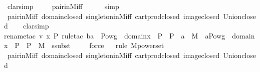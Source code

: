 \begin{isabellebody}
\ clarsimp\ \isanewline
\ \ \isamarkupfalse%
\ pair{\isacharunderscore}{\kern0pt}in{\isacharunderscore}{\kern0pt}M{\isacharunderscore}{\kern0pt}iff\ \isanewline
\ \ \ \isamarkupfalse%
\ simp\isanewline
\ \ \isamarkupfalse%
\ pair{\isacharunderscore}{\kern0pt}in{\isacharunderscore}{\kern0pt}M{\isacharunderscore}{\kern0pt}iff\ domain{\isacharunderscore}{\kern0pt}closed\ singleton{\isacharunderscore}{\kern0pt}in{\isacharunderscore}{\kern0pt}M{\isacharunderscore}{\kern0pt}iff\ cartprod{\isacharunderscore}{\kern0pt}closed\ image{\isacharunderscore}{\kern0pt}closed\ Union{\isacharunderscore}{\kern0pt}closed\isanewline
\ \ \isamarkupfalse%
\ clarsimp\ \isanewline
\ \ \isamarkupfalse%
{\isacharparenleft}{\kern0pt}rename{\isacharunderscore}{\kern0pt}tac\ v\ x\ P{\isacharcomma}{\kern0pt}\ rule{\isacharunderscore}{\kern0pt}tac\ b{\isacharequal}{\kern0pt}{\isachardoublequoteopen}{\isacharbraceleft}{\kern0pt}a\ {\isasymin}\ Pow{\isacharparenleft}{\kern0pt}{\isacharparenleft}{\kern0pt}{\isasymUnion}{\isacharparenleft}{\kern0pt}g\ {\isacharbackquote}{\kern0pt}{\isacharbackquote}{\kern0pt}\ {\isacharparenleft}{\kern0pt}domain{\isacharparenleft}{\kern0pt}x{\isacharparenright}{\kern0pt}\ {\isasymtimes}\ {\isacharbraceleft}{\kern0pt}P{\isacharbraceright}{\kern0pt}{\isacharparenright}{\kern0pt}{\isacharparenright}{\kern0pt}{\isacharparenright}{\kern0pt}\ {\isasymtimes}\ P{\isacharparenright}{\kern0pt}\ {\isachardot}{\kern0pt}\ a\ {\isasymin}\ M{\isacharbraceright}{\kern0pt}{\isachardoublequoteclose}\ \ a{\isacharequal}{\kern0pt}{\isachardoublequoteopen}Pow{\isacharparenleft}{\kern0pt}{\isacharparenleft}{\kern0pt}{\isasymUnion}{\isacharparenleft}{\kern0pt}g\ {\isacharbackquote}{\kern0pt}{\isacharbackquote}{\kern0pt}\ {\isacharparenleft}{\kern0pt}domain{\isacharparenleft}{\kern0pt}x{\isacharparenright}{\kern0pt}\ {\isasymtimes}\ {\isacharbraceleft}{\kern0pt}P{\isacharbraceright}{\kern0pt}{\isacharparenright}{\kern0pt}{\isacharparenright}{\kern0pt}{\isacharparenright}{\kern0pt}\ {\isasymtimes}\ P{\isacharparenright}{\kern0pt}\ {\isasyminter}\ M{\isachardoublequoteclose}\ \ ssubst{\isacharparenright}{\kern0pt}\isanewline
\ \ \ \isamarkupfalse%
\ force\isanewline
\ \ \isamarkupfalse%
{\isacharparenleft}{\kern0pt}rule\ M{\isacharunderscore}{\kern0pt}powerset{\isacharparenright}{\kern0pt}\isanewline
\ \ \isamarkupfalse%
\ pair{\isacharunderscore}{\kern0pt}in{\isacharunderscore}{\kern0pt}M{\isacharunderscore}{\kern0pt}iff\ domain{\isacharunderscore}{\kern0pt}closed\ singleton{\isacharunderscore}{\kern0pt}in{\isacharunderscore}{\kern0pt}M{\isacharunderscore}{\kern0pt}iff\ cartprod{\isacharunderscore}{\kern0pt}closed\ image{\isacharunderscore}{\kern0pt}closed\ Union{\isacharunderscore}{\kern0pt}closed\isanewline

\end{isabellebody}
